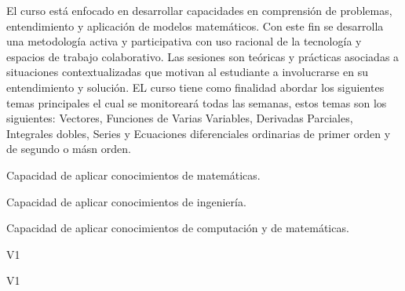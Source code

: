 \begin{syllabus}


\begin{justification}
  El curso está enfocado en desarrollar capacidades en comprensión de problemas, entendimiento y aplicación de modelos matemáticos. Con este fin se desarrolla una metodología activa y participativa con uso racional de la tecnología y espacios de trabajo colaborativo. Las sesiones son teóricas y prácticas asociadas a situaciones contextualizadas que motivan al estudiante a involucrarse en su entendimiento y solución.
  EL curso tiene como finalidad abordar los siguientes temas principales el cual se monitoreará todas las semanas, estos temas son los siguientes: Vectores, Funciones de Varias Variables, Derivadas Parciales, Integrales dobles, Series y Ecuaciones diferenciales ordinarias de primer orden y de segundo o másn orden.
\end{justification}

\begin{goals}
  \item Capacidad de aplicar conocimientos de matemáticas.
  \item Capacidad de aplicar conocimientos de ingeniería.
  \item Capacidad de aplicar conocimientos de computación y de matemáticas.
\end{goals}

\begin{outcomes}{V1}
    \item {}  
    \item {}
\end{outcomes}

\begin{specificoutcomes}{V1}
      \item {}
      \item {}
      \item {}
      \item {}
      \item {}
      \item {}
      \item {}
      \item {}
\end{specificoutcomes}


\end{syllabus}
